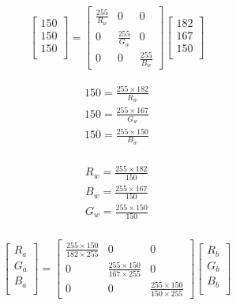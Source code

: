 \begin{gather}
    \begin{bmatrix}
        150 \\
        150 \\
        150 \\       
    \end{bmatrix}
    =
    \begin{bmatrix}
        \frac{255}{R_w} & 0 & 0 \\
        0 & \frac{255}{G_w} & 0 \\
        0 & 0 & \frac{255}{B_w}
    \end{bmatrix}
    \begin{bmatrix}
        182 \\
        167 \\
        150 \\
    \end{bmatrix}
\end{gather}

\begin{gather*}
    150 = \frac{255\times182}{R_w} \\
    150 = \frac{255\times167}{G_w} \\
    150 = \frac{255\times150}{B_w} \\
\end{gather*}

\begin{gather*}
    R_w = \frac{255\times182}{150} \\
    B_w = \frac{255\times167}{150} \\
    G_w = \frac{255\times150}{150} \\ 
\end{gather*}

\begin{gather}
    \begin{bmatrix}
        R_a \\
        G_a \\
        B_a \\       
    \end{bmatrix}
    =
    \begin{bmatrix}
        \frac{255\times150}{182\times255} & 0 & 0 \\
        0 & \frac{255\times150}{167\times255} & 0 \\
        0 & 0 & \frac{255\times150}{150\times255}
    \end{bmatrix}
    \begin{bmatrix}
        R_b \\
        G_b \\
        B_b \\
    \end{bmatrix}
\end{gather}

